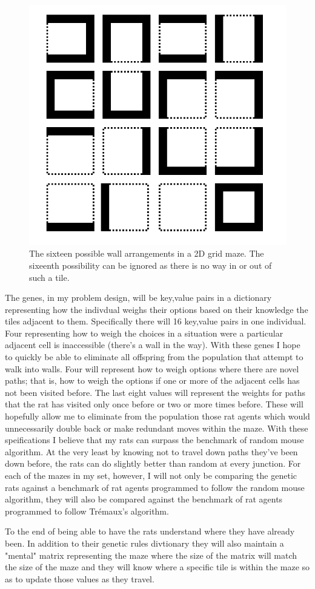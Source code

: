 \documentclass[12pt]{article}
\begin{document}
\begin{figure}[H]
	\centering
	\includegraphics[width=0.4\linewidth]{maze_points.png}
	\caption {The sixteen possible wall arrangements in a 2D grid maze. The sixeenth possibility can be ignored as there is no way in or out of such a tile.}
\end{figure}

The genes, in my problem design, will be key,value pairs in a dictionary representing how the indivdual weighs their options based on their knowledge the tiles adjacent to them. Specifically there will 16 key,value pairs in one individual. Four representing how to weigh the choices in a situation were a particular adjacent cell is inaccessible (there's a wall in the way). With these genes I hope to quickly be able to eliminate all offspring from the population that attempt to walk into walls. Four will represent how to weigh options where there are novel paths; that is, how to weigh the options if one or more of the adjacent cells has not been visited before. The last eight values will represent the weights for paths that the rat has visited only once before or two or more times before. These will hopefully allow me to eliminate from the population those rat agents which would unnecessarily double back or make redundant moves within the maze. With these speifications I believe that my rats can surpass the benchmark of random mouse algorithm. At the very least by knowing not to travel down paths they've been down before, the rats can do slightly better than random at every junction. For each of the mazes in my set, however, I will not only be comparing the genetic rats against a benchmark of rat agents programmed to follow the random mouse algorithm, they will also be compared against the benchmark of rat agents programmed to follow Tr\'{e}maux's algorithm.

\hspace*{\parindent} To the end of being able to have the rats understand where they have already been. In addition to their genetic rules divtionary they will also maintain a "mental" matrix representing the maze where the size of the matrix will match the size of the maze and they will know where a specific tile is within the maze so as to update those values as they travel. 
\end{document}
